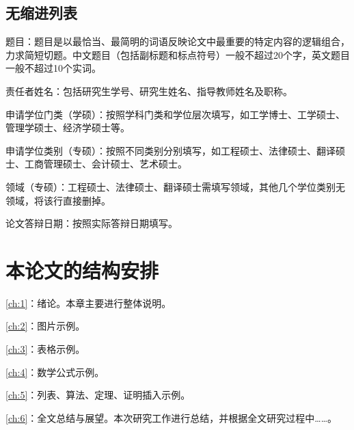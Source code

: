 \subsection{无缩进列表}
\begin{enumerateni}
    \item 题目：题目是以最恰当、最简明的词语反映论文中最重要的特定内容的逻辑组合，力求简短切题。中文题目（包括副标题和标点符号）一般不超过20个字，英文题目一般不超过10个实词。
    \item 责任者姓名：包括研究生学号、研究生姓名、指导教师姓名及职称。
    \item 申请学位门类（学硕）：按照学科门类和学位层次填写，如工学博士、工学硕士、管理学硕士、经济学硕士等。
    \item 申请学位类别（专硕）：按照不同类别分别填写，如工程硕士、法律硕士、翻译硕士、工商管理硕士、会计硕士、艺术硕士。
    \item 领域（专硕）：工程硕士、法律硕士、翻译硕士需填写领域，其他几个学位类别无领域，将该行直接删掉。
    \item 论文答辩日期：按照实际答辩日期填写。
\end{enumerateni}

\section{本论文的结构安排}
\cref{ch:1}：绪论。本章主要进行整体说明。

\cref{ch:2}：图片示例。

\cref{ch:3}：表格示例。

\cref{ch:4}：数学公式示例。

\cref{ch:5}：列表、算法、定理、证明插入示例。

\cref{ch:6}：全文总结与展望。本次研究工作进行总结，并根据全文研究过程中……。


